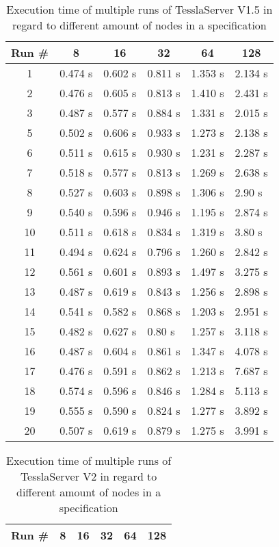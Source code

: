 \begin{table}[!htb]
  \centering
  \caption{Execution time of multiple runs of TesslaServer V1.5 in regard to different amount of nodes in a specification}
  \label{table:tessla_server_v1_5_num_nodes}
  \begin{tabular}{clllll}
    Run \# & \multicolumn{1}{c}{8} & \multicolumn{1}{c}{16} & \multicolumn{1}{c}{32} & \multicolumn{1}{c}{64} & \multicolumn{1}{c}{128}\\ \hline
    1 & 0.474 s & 0.602 s & 0.811 s & 1.353 s & 2.134 s \\
    2 & 0.476 s & 0.605 s & 0.813 s & 1.410 s & 2.431 s \\
    3 & 0.487 s & 0.577 s & 0.884 s & 1.331 s & 2.015 s \\
    5 & 0.502 s & 0.606 s & 0.933 s & 1.273 s & 2.138 s \\
    6 & 0.511 s & 0.615 s & 0.930 s & 1.231 s & 2.287 s \\
    7 & 0.518 s & 0.577 s & 0.813 s & 1.269 s & 2.638 s \\
    8 & 0.527 s & 0.603 s & 0.898 s & 1.306 s & 2.90 s  \\
    9 & 0.540 s & 0.596 s & 0.946 s & 1.195 s & 2.874 s \\
    10 &0.511 s & 0.618 s & 0.834 s & 1.319 s & 3.80 s  \\
    11 &0.494 s & 0.624 s & 0.796 s & 1.260 s & 2.842 s \\
    12 &0.561 s & 0.601 s & 0.893 s & 1.497 s & 3.275 s \\
    13 &0.487 s & 0.619 s & 0.843 s & 1.256 s & 2.898 s \\
    14 &0.541 s & 0.582 s & 0.868 s & 1.203 s & 2.951 s \\
    15 &0.482 s & 0.627 s & 0.80 s  & 1.257 s & 3.118 s \\
    16 &0.487 s & 0.604 s & 0.861 s & 1.347 s & 4.078 s \\
    17 &0.476 s & 0.591 s & 0.862 s & 1.213 s & 7.687 s \\
    18 &0.574 s & 0.596 s & 0.846 s & 1.284 s & 5.113 s \\
    19 &0.555 s & 0.590 s & 0.824 s & 1.277 s & 3.892 s \\
    20 &0.507 s & 0.619 s & 0.879 s & 1.275 s & 3.991 s
  \end{tabular}
\end{table}

\begin{table}[!htb]
  \centering
  \caption{Execution time of multiple runs of TesslaServer V2 in regard to different amount of nodes in a specification}
  \label{table:tessla_server_v2_num_nodes}
  \begin{tabular}{clllll}
    Run \# & \multicolumn{1}{c}{8} & \multicolumn{1}{c}{16} & \multicolumn{1}{c}{32} & \multicolumn{1}{c}{64} & \multicolumn{1}{c}{128}\\ \hline
  \end{tabular}
\end{table}


